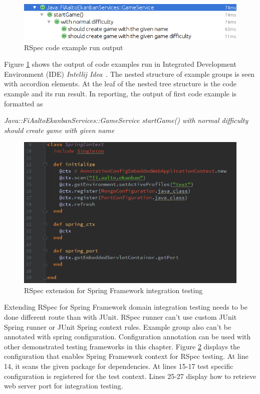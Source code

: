     \begin{figure}[ht]
      \begin{center}
        \includegraphics[width=12.0cm]{images/rspec-result.png}
        \caption{RSpec code example run output}
        \label{fig:rspec-result}
      \end{center}
    \end{figure}
    Figure \ref{fig:rspec-result} shows the output of code examples run in Integrated Development Environment (IDE) \textit{Intellij Idea}~\cite{intellij}.
    The nested structure of example groups
    is seen with accordion elements. At the leaf of the nested tree structure is the code example and its run result. In
    reporting, the output of first code example is formatted as
    \begin{center}
    \textit{Java::FiAaltoEkanbanServices::GameService startGame() with normal difficulty should create game with given name}
    \end{center}

    \begin{figure}[H]
      \begin{center}
        \includegraphics[width=12.0cm]{images/rspec-config.png}
        \caption{RSpec extension for Spring Framework integration testing}
        \label{fig:rspec-config}
      \end{center}
    \end{figure}

    Extending RSpec for Spring Framework domain integration testing needs to be done different route than with JUnit. RSpec
    runner can't use custom JUnit Spring runner or JUnit Spring context rules. Example group also can't be annotated with
    spring configuration. Configuration annotation can be used with other demonstrated testing frameworks in this chapter. Figure \ref{fig:rspec-config}
    displays the configuration that enables Spring Framework context for RSpec testing. At line 14, it scans the given
    package for dependencies. At lines 15-17 test specific configuration is registered for the test context. Lines 25-27
    display how to retrieve web server port for integration testing.

